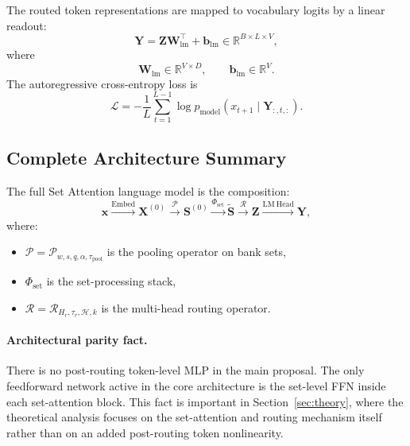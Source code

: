 \documentclass{article}
\theoremstyle{plain}
\theoremstyle{definition}
\theoremstyle{remark}
\begin{document}
The routed token representations are mapped to vocabulary logits by a linear readout:
\begin{equation}
\label{eq:output-logits}
\mathbf Y=\mathbf Z\mathbf W_{\mathrm{lm}}^\top+\mathbf b_{\mathrm{lm}}
\in\mathbb R^{B\times L\times V},
\end{equation}
where
\begin{equation}
\mathbf W_{\mathrm{lm}}\in\mathbb R^{V\times D},
\qquad
\mathbf b_{\mathrm{lm}}\in\mathbb R^V.
\end{equation}
The autoregressive cross-entropy loss is
\begin{equation}
\label{eq:cross-entropy}
\mathcal L
=
-\frac{1}{L}\sum_{t=1}^{L-1}
\log p_{\mathrm{model}}(x_{t+1}\mid \mathbf Y_{:,t,:}).
\end{equation}

\subsection{Complete Architecture Summary}
\label{sec:architecture-summary}

The full Set Attention language model is the composition:
\begin{equation}
\label{eq:full-pipeline}
\mathbf x
\xrightarrow{\mathrm{Embed}}
\mathbf X^{(0)}
\xrightarrow{\mathcal P}
\mathbf S^{(0)}
\xrightarrow{\Phi_{\mathrm{set}}}
\widetilde{\mathbf S}
\xrightarrow{\mathcal R}
\mathbf Z
\xrightarrow{\mathrm{LM\ Head}}
\mathbf Y,
\end{equation}
where:
\begin{itemize}
    \item $\mathcal P=\mathcal P_{w,s,q,\alpha,\tau_{\mathrm{pool}}}$ is the pooling operator on bank sets,
    \item $\Phi_{\mathrm{set}}$ is the set-processing stack,
    \item $\mathcal R=\mathcal R_{H_r,\tau_r,\mathcal H,k}$ is the multi-head routing operator.
\end{itemize}

\paragraph{Architectural parity fact.}
There is no post-routing token-level MLP in the main proposal. The only feedforward network active in the core architecture is the set-level FFN inside each set-attention block. This fact is important in Section~\ref{sec:theory}, where the theoretical analysis focuses on the set-attention and routing mechanism itself rather than on an added post-routing token nonlinearity.
\end{document}

